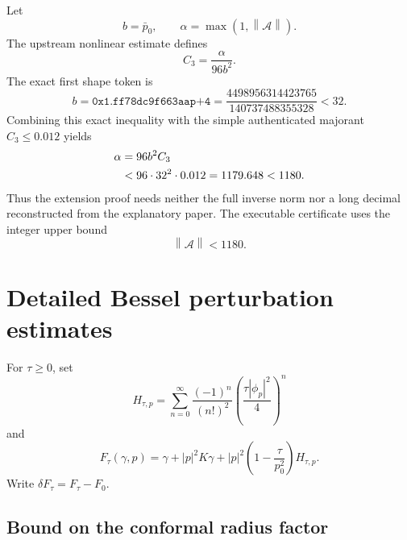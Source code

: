 \documentclass[11pt]{amsart}
\newcommand{\norm}[1]{\left\lVert #1\right\rVert}
\newcommand{\abs}[1]{\left\lvert #1\right\rvert}
\begin{document}
Let
\[
  b=\bar p_0,
  \qquad
  \alpha=\max(1,\norm{\mathcal A}).
\]
The upstream nonlinear estimate defines
\begin{equation}\label{eq:C3}
  C_3=\frac{\alpha}{96b^2}.
\end{equation}
The exact first shape token is
\[
  b=\texttt{0x1.ff78dc9f663aap+4}
  =\frac{4498956314423765}{140737488355328}<32.
\]
Combining this exact inequality with the simple authenticated majorant
$C_3\le0.012$ yields
\begin{align}
  \alpha
  &=96b^2C_3\notag\\
  &<96\cdot32^2\cdot0.012
   =1179.648<1180.
  \label{eq:alpha}
\end{align}
Thus the extension proof needs neither the full inverse norm nor a long
decimal reconstructed from the explanatory paper.  The executable
certificate uses the integer upper bound
\begin{equation}\label{eq:alpha1180}
  \boxed{\norm{\mathcal A}<1180.}
\end{equation}

\section{Detailed Bessel perturbation estimates}

For $\tau\ge0$, set
\begin{equation}\label{eq:H}
  H_{\tau,p}
  =\sum_{n=0}^{\infty}
  \frac{(-1)^n}{(n!)^2}
  \left(\frac{\tau\abs{\phi_p}^2}{4}\right)^n
\end{equation}
and
\begin{equation}\label{eq:Ftau}
  F_\tau(\gamma,p)
  =\gamma+\abs p^2K\gamma
  +\abs p^2\left(1-\frac\tau{p_0^2}\right)H_{\tau,p}.
\end{equation}
Write $\delta F_\tau=F_\tau-F_0$.

\subsection{Bound on the conformal radius factor}
\end{document}
